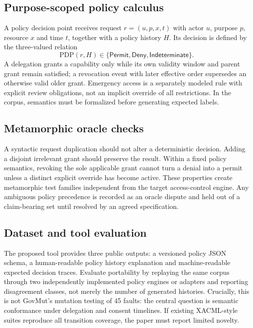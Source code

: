 \documentclass[11pt,a4paper]{article}
\begin{document}
\subsection{Purpose-scoped policy calculus}
A policy decision point receives request $r=(u,p,x,t)$ with actor $u$, purpose $p$, resource $x$ and time $t$, together with a policy history $H$. Its decision is defined by the three-valued relation
\[
\mathrm{PDP}(r,H)\in\{\mathsf{Permit},\mathsf{Deny},\mathsf{Indeterminate}\}.
\] A delegation grants a capability only while its own validity window and parent grant remain satisfied; a revocation event with later effective order supersedes an otherwise valid older grant. Emergency access is a separately modeled rule with explicit review obligations, not an implicit override of all restrictions. In the corpus, semantics must be formalized before generating expected labels.

\subsection{Metamorphic oracle checks}
A syntactic request duplication should not alter a deterministic decision. Adding a disjoint irrelevant grant should preserve the result. Within a fixed policy semantics, revoking the sole applicable grant cannot turn a denial into a permit unless a distinct explicit override has become active. These properties create metamorphic test families independent from the target access-control engine. Any ambiguous policy precedence is recorded as an oracle dispute and held out of a claim-bearing set until resolved by an agreed specification.

\subsection{Dataset and tool evaluation}
The proposed tool provides three public outputs: a versioned policy JSON schema, a human-readable policy history explanation and machine-readable expected decision traces. Evaluate portability by replaying the same corpus through two independently implemented policy engines or adapters and reporting disagreement classes, not merely the number of generated histories. Crucially, this is not GovMut's mutation testing of 45 faults: the central question is semantic conformance under delegation and consent timelines. If existing XACML-style suites reproduce all transition coverage, the paper must report limited novelty.
\end{document}
